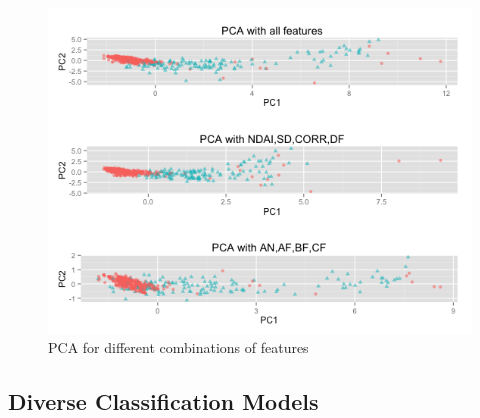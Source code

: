\documentclass[english]{article}\usepackage{graphicx, color}
\numberwithin{equation}{section}
\numberwithin{figure}{section}
\begin{document}
\begin{figure}[!h]
  \begin{center}
    \includegraphics[width=\columnwidth]{figures/PCA_selection.png}
  \end{center}
  \caption{PCA for different combinations of features}
  \label{fig:PCA}
\end{figure}


\subsection{Diverse Classification Models}
\end{document}
